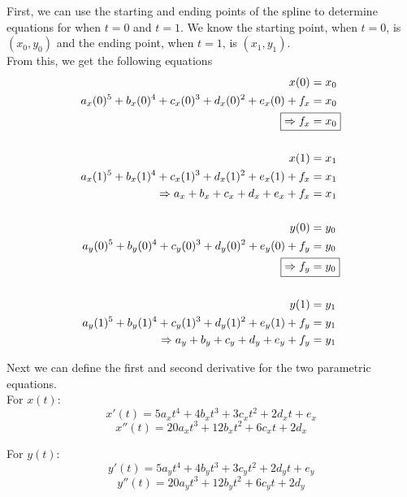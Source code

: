 \documentclass[12pt, letterpaper]{article}
\begin{document}
\newpage
First, we can use the starting and ending points of the spline to determine equations for when \(t = 0\) and \(t = 1\). We know the starting point, when \(t = 0\), is \((x_0, y_0)\) and the ending point, when \(t = 1\), is \((x_1, y_1)\). \\

From this, we get the following equations 
\begin{align}
x(0) &= x_0 \nonumber \\
a_x (0)^5 + b_x (0)^4 + c_x (0)^3 + d_x (0)^2 + e_x (0) + f_x &= x_0 \nonumber \\
\Aboxed{\Rightarrow f_x &= x_0} \\
\nonumber \\
x(1) &= x_1 \nonumber \\
a_x (1)^5 + b_x (1)^4 + c_x (1)^3 + d_x (1)^2 + e_x (1) + f_x &= x_1 \nonumber \\
\Rightarrow a_x + b_x + c_x + d_x + e_x + f_x &= x_1 \\
\nonumber \\
y(0) &= y_0 \nonumber \\
a_y (0)^5 + b_y (0)^4 + c_y (0)^3 + d_y (0)^2 + e_y (0) + f_y &= y_0 \nonumber \\
\Aboxed{\Rightarrow f_y &= y_0} \\
\nonumber \\
y(1) &= y_1 \nonumber \\
a_y (1)^5 + b_y (1)^4 + c_y (1)^3 + d_y (1)^2 + e_y (1) + f_y &= y_1 \nonumber \\
\Rightarrow a_y + b_y + c_y + d_y + e_y + f_y &= y_1
\end{align}

Next we can define the first and second derivative for the two parametric equations. \\
For \(x(t)\): 
\[x'(t) = 5a_xt^4 + 4b_xt^3 + 3c_xt^2 + 2d_xt + e_x\]
\[x''(t) = 20a_xt^3 + 12b_xt^2 + 6c_xt + 2d_x\]

For \(y(t)\): 
\[y'(t) = 5a_yt^4 + 4b_yt^3 + 3c_yt^2 + 2d_yt + e_y\]
\[y''(t) = 20a_yt^3 + 12b_yt^2 + 6c_yt + 2d_y\]
\end{document}
